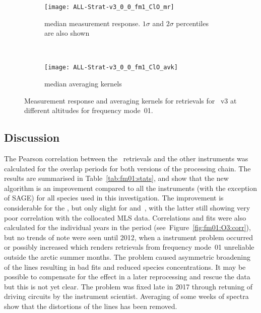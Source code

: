 \begin{figure}[tbhp]
    \centering
    \begin{subfigure}[b]{0.49\textwidth}
        \texttt{[image: ALL-Strat-v3\_0\_0\_fm1\_ClO\_mr]}
        \caption{median measurement response.  $1\sigma$ and $2\sigma$
        percentiles are also shown}
        \label{fig:fm01:ClO:mr}
    \end{subfigure}
    \,
    \begin{subfigure}[b]{0.49\textwidth}
        \texttt{[image: ALL-Strat-v3\_0\_0\_fm1\_ClO\_avk]}
        \caption{median averaging kernels\newline~}
        \label{fig:fm01:ClO:avk}
    \end{subfigure}
    \caption{Measurement response and averaging kernels for 
    retrievals for \smr~v3 at different altitudes for frequency mode~01.}
    \label{fig:fm01:ClO:mr_avk}
\end{figure}

\newpage
\subsection{Discussion}
\label{sec:fm01:discussion}
The Pearson correlation between the \smr\ retrievals and the other instruments
was calculated for the overlap periods for both versions of the processing
chain.  The results are summarised in Table~\ref{tab:fm01:stats}, and show that
the new algorithm is an improvement compared to all the instruments (with the
exception of SAGE) for all species used in this investigation. The improvement
is considerable for the , but only slight for 
and~, with the latter still showing very poor correlation with the
collocated MLS data. Correlations and fits were also calculated for the
individual years in the period (see~Figure~\ref{fig:fm01:O3:corr}), but no
trends of note were seen until 2012, when a instrument problem occurred or
possibly increased which renders retrievals from frequency mode~01 unreliable
outside the arctic summer months.  The problem caused asymmetric broadening of
the lines resulting in bad fits and reduced species concentrations. It may be
possible to compensate for the effect in a later reprocessing and rescue the
data but this is not yet clear. The problem was fixed late in 2017 through
retuning of driving circuits by the instrument scientist.  Averaging of some
weeks of spectra show that the distortions of the lines has been removed.



